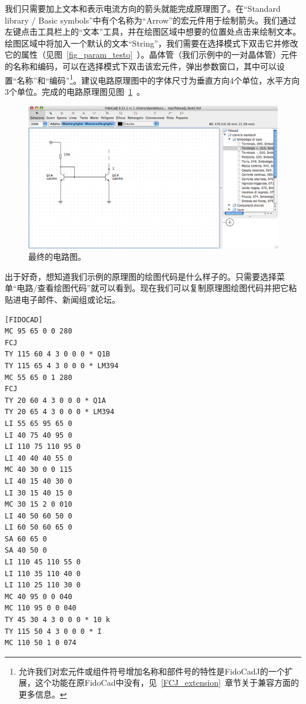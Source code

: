 \documentclass[10pt,a4paper,twoside]{scrreprt}
\begin{document}
我们只需要加上文本和表示电流方向的箭头就能完成原理图了。在{}“Standard library / Basic symbols”中有个名称为{}“Arrow”的宏元件用于绘制箭头。我们通过左键点击工具栏上的{}“文本”工具，并在绘图区域中想要的位置处点击来绘制文本。绘图区域中将加入一个默认的文本{}“String”，我们需要在选择模式下双击它并修改它的属性（见图~\ref{fig_param_testo}~）。晶体管（我们示例中的一对晶体管）元件的名称和编码，可以在选择模式下双击该宏元件，弹出参数窗口，其中可以设置{}“名称”和{}“编码”\footnote{允许我们对宏元件或组件符号增加名称和部件号的特性是FidoCadJ的一个扩展，这个功能在原FidoCad中没有，见~\ref{FCJ_extension}~章节关于兼容方面的更多信息。}。建议电路原理图中的字体尺寸为垂直方向4个单位，水平方向3个单位。完成的电路原理图见图~\ref{fig_fidocadj_fase5}~。

\begin{figure}
\includegraphics[width=1\textwidth,]{fidocadj_fase5} 
\caption{最终的电路图。}
\label{fig_fidocadj_fase5} 
\end{figure}

出于好奇，想知道我们示例的原理图的绘图代码是什么样子的。只需要选择菜单{}“电路/查看绘图代码”就可以看到。现在我们可以复制原理图绘图代码并把它粘贴进电子邮件、新闻组或论坛。

\begin{lstlisting}
[FIDOCAD]
MC 95 65 0 0 280
FCJ
TY 115 60 4 3 0 0 0 * Q1B
TY 115 65 4 3 0 0 0 * LM394
MC 55 65 0 1 280
FCJ
TY 20 60 4 3 0 0 0 * Q1A
TY 20 65 4 3 0 0 0 * LM394
LI 55 65 95 65 0
LI 40 75 40 95 0
LI 110 75 110 95 0
LI 40 40 40 55 0
MC 40 30 0 0 115
LI 40 15 40 30 0
LI 30 15 40 15 0
MC 30 15 2 0 010
LI 40 50 60 50 0
LI 60 50 60 65 0
SA 60 65 0
SA 40 50 0
LI 110 45 110 55 0
LI 110 35 110 40 0
LI 110 25 110 30 0
MC 40 95 0 0 040
MC 110 95 0 0 040
TY 45 30 4 3 0 0 0 * 10 k
TY 115 50 4 3 0 0 0 * I
MC 110 50 1 0 074
\end{lstlisting} 
\end{document}
